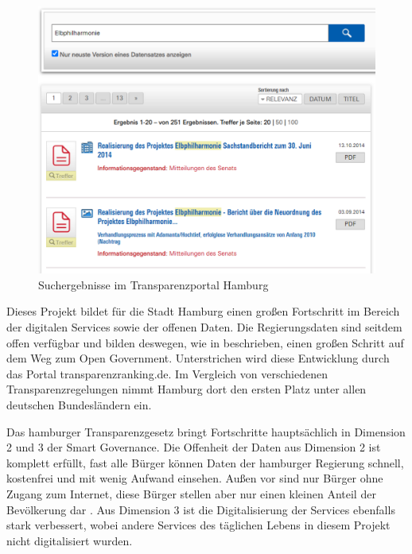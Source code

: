\begin{figure}
	\includegraphics[width=\textwidth]{graphics/3-transparenzportal}
	\caption[Suchergebnisse im Transparenzportal Hamburg]{Suchergebnisse im Transparenzportal Hamburg}
	\label{fig:3_transparenzportal}
\end{figure}

Dieses Projekt bildet für die Stadt Hamburg einen großen Fortschritt im Bereich der digitalen Services sowie der offenen Daten. Die Regierungsdaten sind seitdem offen verfügbar und bilden deswegen, wie in \citeauthor[15]{Fuetterer.2020} beschrieben, einen großen Schritt auf dem Weg zum Open Government. Unterstrichen wird diese Entwicklung durch das Portal transparenzranking.de. Im Vergleich von verschiedenen Transparenzregelungen nimmt Hamburg dort den ersten Platz unter allen deutschen Bundesländern ein.

Das hamburger Transparenzgesetz bringt Fortschritte hauptsächlich in Dimension 2 und 3 der Smart Governance. Die Offenheit der Daten aus Dimension 2 ist komplett erfüllt, fast alle Bürger können Daten der hamburger Regierung schnell, kostenfrei und mit wenig Aufwand einsehen. Außen vor sind nur Bürger ohne Zugang zum Internet, diese Bürger stellen aber nur einen kleinen Anteil der Bevölkerung dar \autocite[10]{Fuetterer.2020}. Aus Dimension 3 ist die Digitalisierung der Services ebenfalls stark verbessert, wobei andere Services des täglichen Lebens in diesem Projekt nicht digitalisiert wurden. 





